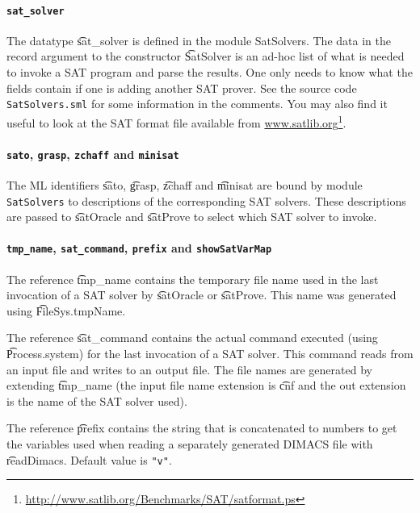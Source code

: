 \paragraph{\tt sat\_solver}${}$\\

The datatype \t{sat\_solver}  is defined in the module {SatSolvers}.
The data in the record argument to the constructor \t{SatSolver}
is an ad-hoc list of what is needed to invoke a SAT program
and parse the results. One only needs to know what the fields
contain if one is adding another SAT prover. See the
source code {\tt SatSolvers.sml} for some information
in the comments. You may also find it useful to look at the SAT format file available from \url{www.satlib.org}\footnote{\url{http://www.satlib.org/Benchmarks/SAT/satformat.ps}}.

\paragraph{{\tt sato}, {\tt grasp}, {\tt zchaff} and {\tt minisat}}${}$\\

The ML identifiers \t{sato}, \t{grasp}, \t{zchaff} and \t{minisat} are bound
by module {\tt SatSolvers} to descriptions of the corresponding SAT solvers.
These descriptions are passed to \t{satOracle} and \t{satProve} to
select which SAT solver to invoke.

\paragraph{{\tt tmp\_name}, {\tt sat\_command}, {\tt prefix} and {\tt showSatVarMap}}${}$\\

The reference \t{tmp\_name} contains the temporary file name used in
the last invocation of a SAT solver  by \t{satOracle} or \t{satProve}. This name
was generated using \t{FileSys.tmpName}.

The reference \t{sat\_command} contains the actual command executed
(using \t{Process.system}) for
the last invocation of a SAT solver. This command reads from
an input file and writes to an output file. The file names are generated by extending \t{tmp\_name}
(the input file name extension is \t{cnf} and the out extension is the name of the SAT solver used).

The reference \t{prefix} contains the string that is concatenated to numbers
to get the \HOL{} variables used when reading a separately generated DIMACS file
with \t{readDimacs}. Default value is {\verb+"v"+}.

